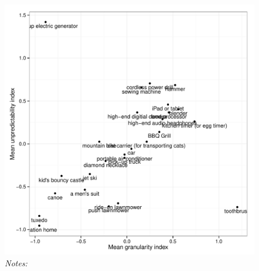 \begin{figure}[h]
             \centering
             \begin{minipage}{0.8 \linewidth}
             \caption{} \label{fig:raw_granularity_versus_predictability}
             \includegraphics[width = \linewidth]{./plots/raw_granularity_versus_predictability.pdf}
{\footnotesize \emph{Notes:} } 
             \end{minipage} 
             \end{figure}